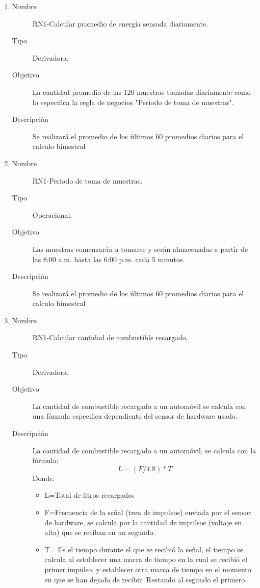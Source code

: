 \begin{enumerate}[label=RN\arabic*.]
\item \label{RN4}
		\begin{description}
			\item[Nombre] RN1-Calcular promedio de energía sensada diariamente.
			\item[Tipo] Derivadora.
			\item[Objetivo] La cantidad promedio de las 120 muestras tomadas diariamente como lo especifica la regla de negocios "Periodo de toma de muestras".
			\item[Descripción] Se realizará el promedio de los últimos 60 promedios diarios para el calculo bimestral
		\end{description}

\item \label{RN5}
		\begin{description}
			\item[Nombre] RN1-Periodo de toma de muestras.
			\item[Tipo] Operacional.
			\item[Objetivo] Las muestras comenzarán a tomarse y serán almacenadas a partir de las 8:00 a.m. hasta las 6:00 p.m. cada 5 minutos.
			\item[Descripción] Se realizará el promedio de los últimos 60 promedios diarios para el calculo bimestral
		\end{description}













	\item \label{RN1}
		\begin{description}
			\item[Nombre] RN1-Calcular cantidad de combustible recargado.
			\item[Tipo] Derivadora.
			\item[Objetivo] La cantidad de combustible recargado a un automóvil se calcula con una fórmula especifica dependiente del sensor de hardware usado.
			\item[Descripción] La cantidad de combustible recargado a un automóvil, se calcula con la fórmula: $$L=(F/4.8)*T$$
			Donde:
				\begin{itemize}
					\item L=Total de litros recargados
					\item F=Frecuencia de la señal (tren de impulsos) enviada por el sensor de hardware, se calcula por la cantidad de impulsos (voltaje en alta) que se reciban en un segundo.
					\item T= Es el tiempo durante el que se recibió la señal, el tiempo se calcula al establecer una marca de tiempo en la cual se recibió el primer impulso, y establecer otra marca de tiempo en el momento en que se han dejado de recibir. Restando al segundo el primero.\cite{FS400A-G1}
				\end{itemize}
		\end{description}


\end{enumerate}
